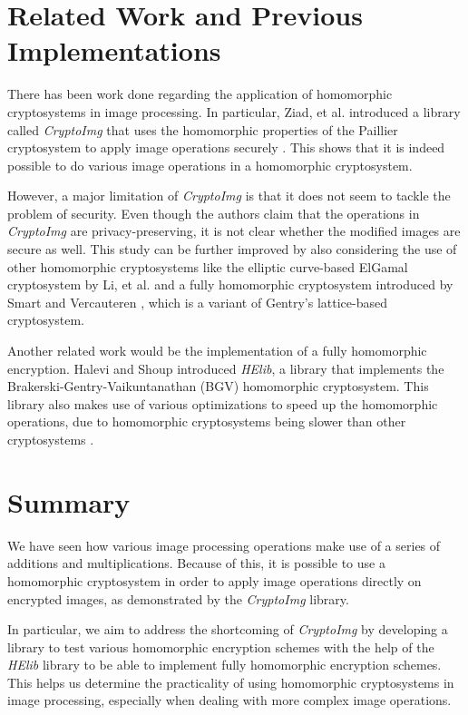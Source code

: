 \section{Related Work and Previous Implementations}




There has been work done regarding the application of homomorphic cryptosystems in image processing. In particular, Ziad, et al. introduced a library called \textit{CryptoImg} that uses the homomorphic properties of the Paillier cryptosystem to apply image operations securely \cite{ziad_cryptoimg:_2016}. This shows that it is indeed possible to do various image operations in a homomorphic cryptosystem.

However, a major limitation of \textit{CryptoImg} is that it does not seem to tackle the problem of security. Even though the authors claim that the operations in \textit{CryptoImg} are privacy-preserving, it is not clear whether the modified images are secure as well.
This study can be further improved by also considering the use of other homomorphic cryptosystems like the elliptic curve-based ElGamal cryptosystem by Li, et al. \cite{li_elliptic_2012} and a fully homomorphic cryptosystem introduced by Smart and Vercauteren \cite{hutchison_fully_2010}, which is a variant of Gentry's lattice-based cryptosystem.

Another related work would be the implementation of a fully homomorphic encryption. Halevi and Shoup \cite{garay_algorithms_2014} introduced \textit{HElib}, a library that implements the Brakerski-Gentry-Vaikuntanathan (BGV) homomorphic cryptosystem. This library also makes use of various optimizations to speed up the homomorphic operations, due to homomorphic cryptosystems being slower than other cryptosystems \cite{sen_homomorphic_2013}.


\section{Summary}
We have seen how various image processing operations make use of a series of additions and multiplications. Because of this, it is possible to use a homomorphic cryptosystem in order to apply image operations directly on encrypted images, as demonstrated by the \textit{CryptoImg} library. 

In particular, we aim to address the shortcoming of \textit{CryptoImg} by developing a library to test various homomorphic encryption schemes with the help of the \textit{HElib} library to be able to implement fully homomorphic encryption schemes. This helps us determine the practicality of using homomorphic cryptosystems in image processing, especially when dealing with more complex image operations.


